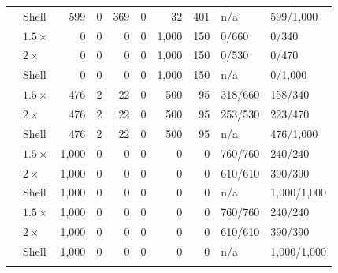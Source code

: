 \begin{longtable}{@{}L{1.38in}lrrrrrrll@{}}
 & Shell & 599 & 0 & 369 & 0 & 32 & 401 & n/a & 599/1,000\\
\addlinespace[3pt]
 & $1.5\times$ & 0 & 0 & 0 & 0 & 1,000 & 150 & 0/660 & 0/340\\*
 & $2\times$ & 0 & 0 & 0 & 0 & 1,000 & 150 & 0/530 & 0/470\\*
 & Shell & 0 & 0 & 0 & 0 & 1,000 & 150 & n/a & 0/1,000\\
\addlinespace[3pt]
 & $1.5\times$ & 476 & 2 & 22 & 0 & 500 & 95 & 318/660 & 158/340\\*
 & $2\times$ & 476 & 2 & 22 & 0 & 500 & 95 & 253/530 & 223/470\\*
 & Shell & 476 & 2 & 22 & 0 & 500 & 95 & n/a & 476/1,000\\
\addlinespace[3pt]
 & $1.5\times$ & 1,000 & 0 & 0 & 0 & 0 & 0 & 760/760 & 240/240\\*
 & $2\times$ & 1,000 & 0 & 0 & 0 & 0 & 0 & 610/610 & 390/390\\*
 & Shell & 1,000 & 0 & 0 & 0 & 0 & 0 & n/a & 1,000/1,000\\
\addlinespace[3pt]
 & $1.5\times$ & 1,000 & 0 & 0 & 0 & 0 & 0 & 760/760 & 240/240\\*
 & $2\times$ & 1,000 & 0 & 0 & 0 & 0 & 0 & 610/610 & 390/390\\*
 & Shell & 1,000 & 0 & 0 & 0 & 0 & 0 & n/a & 1,000/1,000\\
\addlinespace[3pt]
\bottomrule\end{longtable}\endgroup
